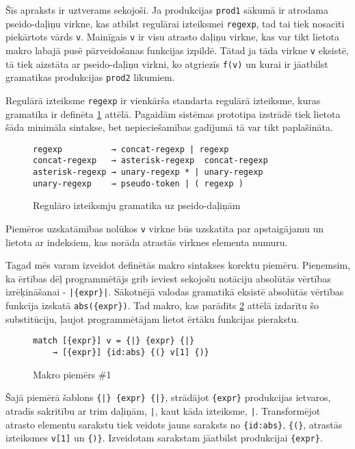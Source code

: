 Šīs apraksts ir uztverams sekojoši. Ja produkcijas \verb|prod1| sākumā ir atrodama pseido-daļiņu virkne, kas atbilst regulārai izteiksmei \verb|regexp|, tad tai tiek nosacīti piekārtots vārds \verb|v|. Mainīgais \verb|v| ir visu atrasto daļiņu virkne, kas var tikt lietota makro labajā pusē pārveidošanas funkcijas izpildē. Tātad ja tāda virkne \verb|v| eksistē, tā tiek aizstāta ar pseido-daļiņu virkni, ko atgriezīs \verb|f(v)| un kurai ir jāatbilst gramatikas produkcijas \verb|prod2| likumiem. 

Regulārā izteiksme \verb|regexp| ir vienkārša standarta regulārā izteiksme, kuras gramatika ir definēta \ref{fig:regexpsyntax} attēlā. Pagaidām sistēmas prototipa izstrādē tiek lietota šāda minimāla sintakse, bet nepieciešamības gadījumā tā var tikt paplašināta.

\begin{figure}[h!]
\begin{verbatim}
regexp          → concat-regexp | regexp
concat-regexp   → asterisk-regexp  concat-regexp
asterisk-regexp → unary-regexp * | unary-regexp
unary-regexp    → pseudo-token | ( regexp )
\end{verbatim}
\caption{\label{fig:regexpsyntax}Regulāro izteiksmju gramatika uz pseido-daļiņām}
\end{figure}

Piemēros uzskatāmības nolūkos \verb|v| virkne būs uzskatīta par apstaigājamu un lietota ar indeksiem, kas norāda atrastās virknes elementa numuru.

Tagad mēs varam izveidot definētās makro sintakses korektu piemēru. Pieņemsim, ka ērtības dēļ programmētājs grib ieviest sekojošu notāciju absolūtās vērtības izrēķināšanai - \verb/|{expr}|/. Sākotnējā valodas gramatikā eksistē absolūtās vērtības funkcija izskatā \verb|abs({expr})|. Tad makro, kas parādīts \ref{fig:matchsample1} attēlā izdarītu šo substitūciju, ļaujot programmētājam lietot ērtāku funkcijas pierakstu.

\begin{figure}[h!]
\begin{verbatim}
match [{expr}] v = {|} {expr} {|}
    → [{expr}] {id:abs} {(} v[1] {)}
\end{verbatim}
\caption{\label{fig:matchsample1}Makro piemērs \#1}
\end{figure}

Šajā piemērā šablons \verb/{|} {expr} {|}/, strādājot \verb|{expr}| produkcijas ietvaros, atradīs sakritību ar trim daļiņām, \verb/|/, kaut kāda izteiksme, \verb/|/. Transformējot atrasto elementu sarakstu tiek veidots jauns saraksts no \verb|{id:abs}|, \verb|{(}|, atrastās izteiksmes \verb|v[1]| un \verb|{)}|. Izveidotam sarakstam jāatbilst produkcijai \verb|{expr}|.

